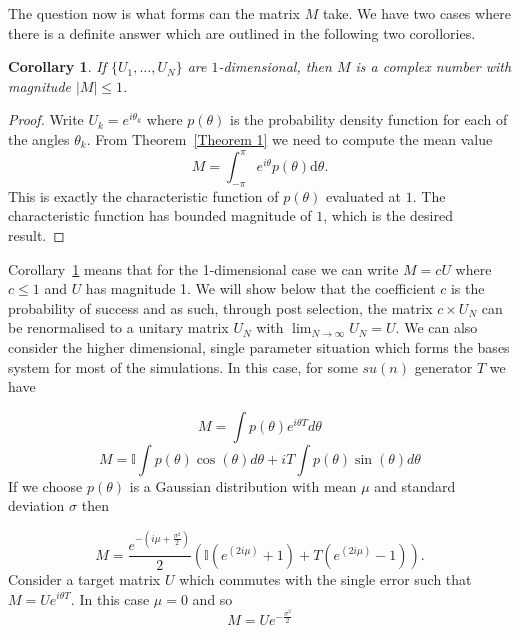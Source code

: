 \documentclass[aps,pra,twocolumn,superscriptaddress,numerical]{revtex4-1}
\newtheorem{corollary}{Corollary}
\begin{document}
The question now is what forms can the matrix $M$ take.  We have two cases where there is a definite answer which are outlined in the following two corollories.

\begin{corollary}
\label{Corollary 1}
	If $\{U_1,\ldots,U_N\}$ are $1$-dimensional, then $M$ is a complex number with magnitude $|M| \leq 1$.
\end{corollary}
\begin{proof}
	Write $U_k = e^{i \theta_k}$ where $p(\theta)$ is the probability density function for each of the angles $\theta_k$. From Theorem~\ref{Theorem 1} we need to compute the mean value 
	\begin{equation}
		M = \int^\pi_{-\pi} e^{i\theta} p(\theta) \mathrm{d}\theta. \label{eq:single parameter, single mode}
	\end{equation}
This is exactly the characteristic function of $p(\theta)$ evaluated at $1$.  The characteristic function has bounded magnitude of $1$, which is the desired result.
\end{proof}

Corollary~\ref{Corollary 1} means that for the 1-dimensional case we can write $M=cU$ where $c \leq 1$ and $U$ has magnitude 1.  We will show below that the coefficient $c$ is the probability of success and as such, through post selection, the matrix $c\times U_{N}$  can be renormalised to a unitary matrix $U_{N}$ with $\lim_{N\rightarrow\infty}U_{N}=U$. We can also consider the higher dimensional, single parameter situation which forms the bases system for most of the simulations. In this case, for some $su(n)$ generator $T$ we have

\begin{equation}
	M=\int p(\theta)e^{i\theta T}d\theta \label{eq:single parameter, multi-mode}
\end{equation}
\begin{equation}
	M=\mathbb{I} \int p(\theta) \cos(\theta)d\theta
		+ i T \int p(\theta) \sin(\theta)d\theta \label{eq:single parameter, multi-mode expanded}
\end{equation}
If we choose $p(\theta)$ is a Gaussian distribution with mean $\mu$ and standard deviation $\sigma$ then

\begin{equation}
M=\frac{e^{-\left(i\mu+\frac{\sigma^2}{2}\right)}}{2}\left(\mathbb{I}\left(e^{(2i\mu)}+1\right)+T\left(e^{(2i\mu)}-1\right)\right).
\end{equation}
Consider a target matrix $U$ which commutes with the single error such that $M=Ue^{i\theta T}$. In this case $\mu=0$ and so
\begin{equation}
M=Ue^{-\frac{\sigma^2}{2}}  \label{eq:Gaussian Psuccess}
\end{equation}
\end{document}
